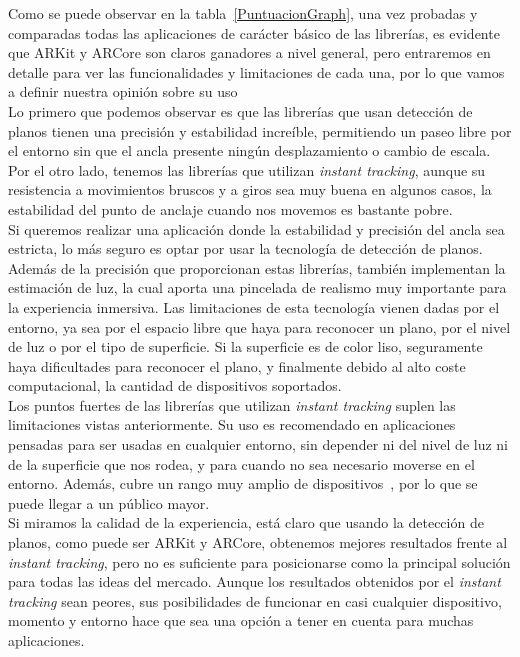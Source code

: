 Como se puede observar en la tabla~\ref{PuntuacionGraph}, una vez probadas y comparadas todas las aplicaciones de carácter básico de las librerías, es evidente que ARKit y ARCore son claros ganadores a nivel general, pero entraremos en detalle para ver las funcionalidades y limitaciones de cada una, por lo que vamos a definir nuestra opinión sobre su uso\\

Lo primero que podemos observar es que las librerías que usan detección de planos tienen una precisión y estabilidad increíble, permitiendo un paseo libre por el entorno sin que el ancla presente ningún desplazamiento o cambio de escala. Por el otro lado, tenemos las librerías que utilizan \textit{instant tracking}, aunque su resistencia a movimientos bruscos y a giros sea muy buena en algunos casos, la estabilidad del punto de anclaje cuando nos movemos es bastante pobre.\\

Si queremos realizar una aplicación donde la estabilidad y precisión del ancla sea estricta, lo más seguro es optar por usar la tecnología de detección de planos. Además de la precisión que proporcionan estas librerías, también implementan la estimación de luz, la cual aporta una pincelada de realismo muy importante para la experiencia inmersiva. Las limitaciones de esta tecnología vienen dadas por el entorno, ya sea por el espacio libre que haya para reconocer un plano, por el nivel de luz o por el tipo de superficie. Si la superficie es de color liso, seguramente haya dificultades para reconocer el plano, y finalmente debido al alto coste computacional, la cantidad de dispositivos soportados.\\

Los puntos fuertes de las librerías que utilizan \textit{instant tracking} suplen las limitaciones vistas anteriormente. Su uso es recomendado en aplicaciones pensadas para ser usadas en cualquier entorno, sin depender ni del nivel de luz ni de la superficie que nos rodea, y para cuando no sea necesario moverse en el entorno. Además, cubre un rango muy amplio de dispositivos~\cite{wikitudeInstant}, por lo que se puede llegar a un público mayor. \\

Si miramos la calidad de la experiencia, está claro que usando la detección de planos, como puede ser ARKit y ARCore, obtenemos mejores resultados frente al \textit{instant tracking}, pero no es suficiente para posicionarse como la principal solución para todas las ideas del mercado. Aunque los resultados obtenidos por el \textit{instant tracking} sean peores, sus posibilidades de funcionar en casi cualquier dispositivo, momento y entorno hace que sea una opción a tener en cuenta para muchas aplicaciones.


\noindent